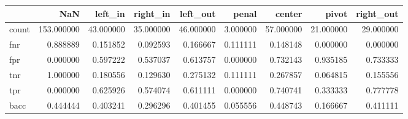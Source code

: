 \begin{tabular}{lrrrrrrrr}
\toprule
{} &         NaN &    left\_in &   right\_in &   left\_out &     penal &     center &      pivot &  right\_out \\
\midrule
count &  153.000000 &  43.000000 &  35.000000 &  46.000000 &  3.000000 &  57.000000 &  21.000000 &  29.000000 \\
fnr   &    0.888889 &   0.151852 &   0.092593 &   0.166667 &  0.111111 &   0.148148 &   0.000000 &   0.000000 \\
fpr   &    0.000000 &   0.597222 &   0.537037 &   0.613757 &  0.000000 &   0.732143 &   0.935185 &   0.733333 \\
tnr   &    1.000000 &   0.180556 &   0.129630 &   0.275132 &  0.111111 &   0.267857 &   0.064815 &   0.155556 \\
tpr   &    0.000000 &   0.625926 &   0.574074 &   0.611111 &  0.000000 &   0.740741 &   0.333333 &   0.777778 \\
bacc  &    0.444444 &   0.403241 &   0.296296 &   0.401455 &  0.055556 &   0.448743 &   0.166667 &   0.411111 \\
\bottomrule
\end{tabular}
